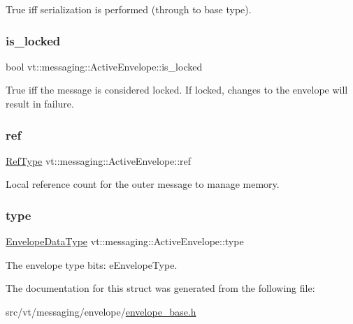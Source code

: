 True iff serialization is performed (through to base type). 

\mbox{\label{structvt_1_1messaging_1_1_active_envelope_a17ded970dbc5c61160848d5ecf5c57ab}} 
\subsubsection{\texorpdfstring{is\+\_\+locked}{is\_locked}}
{\footnotesize\ttfamily bool vt\+::messaging\+::\+Active\+Envelope\+::is\+\_\+locked}

True iff the message is considered locked. If locked, changes to the envelope will result in failure. \mbox{\label{structvt_1_1messaging_1_1_active_envelope_a61861e4316e9c65f7a18ba792da412e2}} 
\subsubsection{\texorpdfstring{ref}{ref}}
{\footnotesize\ttfamily \hyperlink{namespacevt_a9b39ce9494bb04674d0d5b895a5aa50f}{Ref\+Type} vt\+::messaging\+::\+Active\+Envelope\+::ref}



Local reference count for the outer message to manage memory. 

\mbox{\label{structvt_1_1messaging_1_1_active_envelope_aaa2cebe2e468e71249feff85841521d4}} 
\subsubsection{\texorpdfstring{type}{type}}
{\footnotesize\ttfamily \hyperlink{namespacevt_a2740126d59f361d9ba46f66b3b4b0d3d}{Envelope\+Data\+Type} vt\+::messaging\+::\+Active\+Envelope\+::type}



The envelope type bits\+: {\ttfamily e\+Envelope\+Type}. 



The documentation for this struct was generated from the following file\+:\begin{DoxyCompactItemize}
\item 
src/vt/messaging/envelope/\hyperlink{envelope__base_8h}{envelope\+\_\+base.\+h}\end{DoxyCompactItemize}
